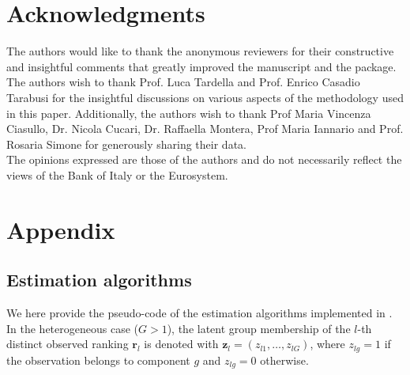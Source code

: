 \section{Acknowledgments}
The authors would like to thank the anonymous
reviewers for their constructive and insightful comments that greatly
improved the manuscript and the package. The authors wish to thank Prof. Luca Tardella and Prof. Enrico Casadio Tarabusi for the insightful discussions on various aspects of the methodology used in this paper. Additionally, the authors wish to thank Prof Maria Vincenza Ciasullo, Dr. Nicola Cucari, Dr. Raffaella Montera, Prof Maria Iannario and Prof. Rosaria Simone for generously sharing their data. \\ The opinions expressed are those of the authors and do not necessarily reflect the views of the Bank of Italy or the Eurosystem.



\address{Marta Crispino\\
  Department of Economics, Statistics and Research\\
  Bank of Italy, Rome, Italy\\
  }

\address{Cristina Mollica\\
 Department of Statistical Sciences\\
 Sapienza University of Rome, Italy\\
  }

\address{Lucia  Modugno\\
 Department of Economics, Statistics and Research\\
  Bank of Italy, Rome, Italy\\
  }

\newpage
\renewenvironment{example}{\itshape \small \begin{quote}}{\end{quote}}

\section{Appendix}
\label{sec:appendix}

\subsection{Estimation algorithms}
\label{app:Algo}
We here provide the pseudo-code of the estimation algorithms implemented in . In the heterogeneous case ($G>1$), the latent group membership of the $l$-th distinct observed ranking $\bm{r}_l$ is denoted with $\bm z_l = (z_{l1},\dots, z_{lG})$, where $z_{lg} = 1$ if the observation belongs to component $g$ and $z_{lg} = 0$ otherwise.

